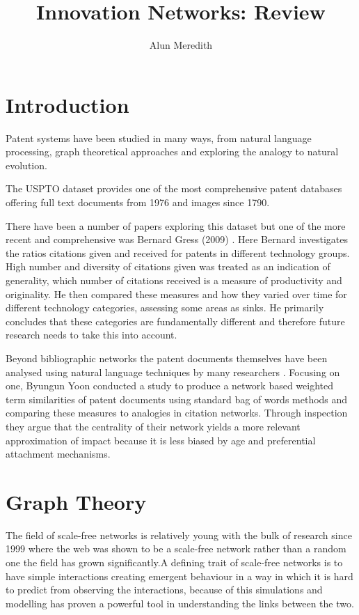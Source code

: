 \documentclass[12pt,journal,compsoc]{IEEEtran}
\begin{document}
\title{Innovation Networks: Review}
\author{Alun Meredith}
\maketitle

\section{Introduction}
Patent systems have been studied in many ways, from natural language processing, graph theoretical approaches and exploring the analogy to natural evolution. 

The USPTO dataset provides one of the most comprehensive patent databases offering full text documents from 1976 and images since 1790. 

There have been a number of papers exploring this dataset but one of the more recent and comprehensive was Bernard Gress (2009) \cite{gress2010properties}. Here Bernard investigates the ratios citations given and received for patents in different technology groups. High number and diversity of citations given was treated as an indication of generality, which number of citations received is a measure of productivity and originality. He then compared these measures and how they varied over time for different technology categories, assessing some areas as sinks. He primarily concludes that these categories are fundamentally different and therefore future research needs to take this into account. 

Beyond bibliographic networks the patent documents themselves have been analysed using natural language techniques by many researchers  \cite{abbas2014literature}. Focusing on one, Byungun Yoon \cite{yoon2004text} conducted a study to produce a network based weighted term similarities of patent documents using standard bag of words methods and comparing these measures to analogies in citation networks. Through inspection they argue that the centrality of their network yields a more relevant approximation of impact because it is less biased by age and preferential attachment mechanisms. 

\section{Graph Theory}
The field of scale-free networks is relatively young with the bulk of research since 1999 where the web was shown to be a scale-free network rather than a random one the field has grown significantly\cite{barabasi1999emergence}.A defining trait of scale-free networks is to have simple interactions creating emergent behaviour in a way in which it is hard to predict from observing the interactions, because of this simulations and modelling has proven a powerful tool in understanding the links between the two. 
\end{document}
